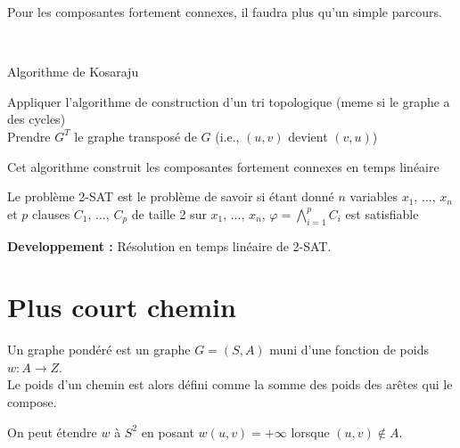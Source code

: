 Pour les composantes fortement connexes, il faudra plus qu'un simple parcours.

\begin{algo}\enspace \\
	\begin{algorithm}[H]
		\caption{Algorithme de Kosaraju}
		Appliquer l'algorithme de construction d'un tri topologique (meme si le graphe a des cycles)\\
		Prendre $G^T$ le graphe transposé de $G$ (i.e., $(u,v)$ devient $(v,u)$)
	\end{algorithm}
\end{algo}

\begin{proposition}
	Cet algorithme construit les composantes fortement connexes en temps linéaire
\end{proposition}

\begin{definition}
	Le problème 2-SAT est le problème de savoir si étant donné $n$ variables $x_1, \,\dots ,\, x_n$ et $p$ clauses $C_1, \,\dots ,\, C_p$ de taille 2 sur $x_1,\, \dots, \, x_n$, $\varphi = \bigwedge\limits_{i=1}^p C_i$ est satisfiable
\end{definition}

\textbf{Developpement :} Résolution en temps linéaire de 2-SAT.

\section{Plus court chemin}

\begin{definition}
	Un graphe pondéré est un graphe $G = (S, A)$ muni d’une fonction de poids $w : A \to Z$.\\
	Le poids d’un chemin est alors défini comme la somme des poids des arêtes qui le compose.
\end{definition}

\begin{rem}
	On peut étendre $w$ à $S^2$ en posant $w(u, v) = +\infty$ lorsque $(u, v) \notin A$.
\end{rem}

